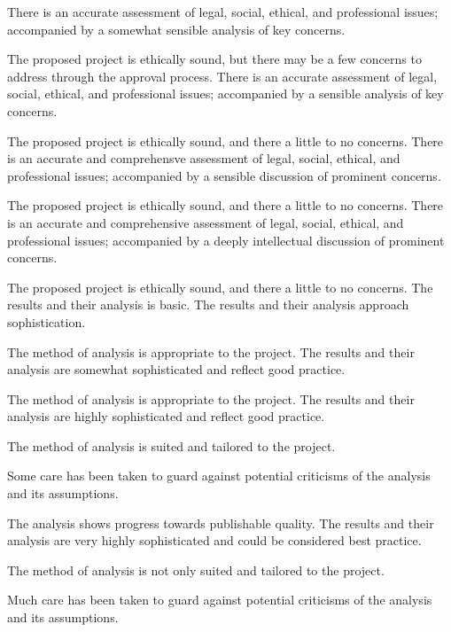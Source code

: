 \begin{markingrubric}
        \grade 		There is an accurate assessment of legal, social, ethical, and professional issues; accompanied by a somewhat sensible analysis of key concerns.
        \par		The proposed project is ethically sound, but there may be a few concerns to address through the approval process.
        \grade 		There is an accurate assessment of legal, social, ethical, and professional issues; accompanied by a sensible analysis of key concerns.
        \par		The proposed project is ethically sound, and there a little to no concerns.
        \grade 		There is an accurate and comprehensve assessment of legal, social, ethical, and professional issues; accompanied by a sensible discussion of prominent concerns.
        \par		The proposed project is ethically sound, and there a little to no concerns.
        \grade 		There is an accurate and comprehensive assessment of legal, social, ethical, and professional issues; accompanied by a deeply intellectual discussion of prominent concerns.
        \par		The proposed project is ethically sound, and there a little to no concerns.
%  
        \grade\fail 
        \grade 		The results and their analysis is basic.
        \grade 		The results and their analysis approach sophistication.
        \par 		The method of analysis is appropriate to the project.
        \grade 		The results and their analysis are somewhat sophisticated and reflect good practice.
        \par 		The method of analysis is appropriate to the project.
        \grade 		The results and their analysis are highly sophisticated and reflect good practice.
        \par 		The method of analysis is suited and tailored to the project.
       \par 		Some care has been taken to guard against potential criticisms of the analysis and its assumptions.
        \par		The analysis shows progress towards publishable quality.
        \grade 		The results and their analysis are very highly sophisticated and could be considered best practice.
        \par 		The method of analysis is not only suited and tailored to the project.
        \par 		Much care has been taken to guard against potential criticisms of the analysis and its assumptions.

\end{markingrubric}

